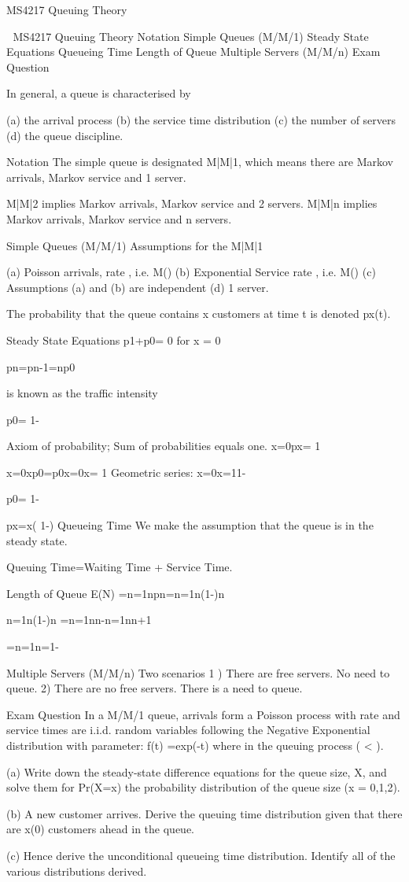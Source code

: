 MS4217 Queuing Theory


MS4217 Queuing Theory
Notation
Simple Queues (M/M/1)
Steady State Equations
Queueing Time
Length of Queue
Multiple Servers (M/M/n)
Exam Question



In general, a queue is characterised by

(a) the arrival process
(b) the service time distribution
(c) the number of servers
(d) the queue discipline.


Notation
The simple queue is designated M|M|1, which means there are Markov arrivals, Markov service and 1 server. 

M|M|2 implies Markov arrivals, Markov service and 2 servers. M|M|n implies Markov arrivals, Markov service and n servers.


Simple Queues (M/M/1)
Assumptions for the M|M|1

(a) Poisson arrivals, rate , i.e. M()
(b) Exponential Service rate , i.e. M()
(c) Assumptions (a) and (b) are independent
(d) 1 server.

The probability that the queue contains x customers at time t is denoted px(t).

Steady State Equations
p1+p0= 0 for x = 0

pn=pn-1=np0

 is known as the traffic intensity

p0= 1-

		
Axiom of probability; Sum of probabilities equals one.
x=0px= 1  
	                       
		
x=0xp0=p0x=0x= 1
Geometric series: x=0x=11-

p0= 1-

px=x( 1-)
Queueing Time  
We make the assumption that the queue is in the steady state.

	Queuing Time=Waiting Time + Service Time.

Length of Queue
E(N) =n=1npn=n=1n(1-)n

		n=1n(1-)n =n=1nn-n=1nn+1
		
	      
		 =n=1n=1-

 


Multiple Servers (M/M/n)
Two scenarios
1 ) There are free servers. No need to queue.
2)  There are no free servers. There is a need to queue.



Exam Question 
In a M/M/1 queue, arrivals form a Poisson process with rate  and service times are i.i.d. random variables following the Negative Exponential distribution with parameter: f(t) =exp(-t) where in the queuing process ( < ).


(a) Write down the steady-state difference equations for the queue size, X, and solve them for Pr(X=x) the probability distribution of the queue size (x = 0,1,2).

(b) A new customer arrives. Derive the queuing time distribution given that there are x(0) customers ahead in the queue.

(c) Hence derive the unconditional queueing time distribution. Identify all of the various distributions derived.





